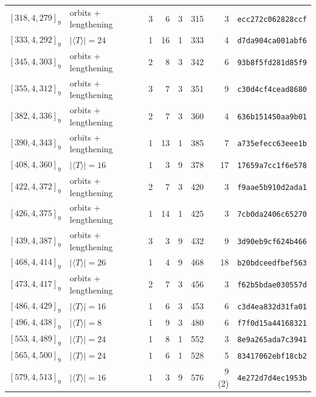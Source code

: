 \begin{longtable}{lllrrrrl}
$[318,4,279]_9$ & orbits + lengthening & 3 & 6 & 3 & 315 & 3 & \texttt{ecc272c062828ccf}\\
$[333,4,292]_9$ & $|\langle T\rangle|=24$ & 1 & 16 & 1 & 333 & 4 & \texttt{d7da904ca001abf6}\\
$[345,4,303]_9$ & orbits + lengthening & 2 & 8 & 3 & 342 & 6 & \texttt{93b8f5fd281d85f9}\\
$[355,4,312]_9$ & orbits + lengthening & 3 & 7 & 3 & 351 & 9 & \texttt{c30d4cf4cead8680}\\
$[382,4,336]_9$ & orbits + lengthening & 2 & 7 & 3 & 360 & 4 & \texttt{636b151450aa9b01}\\
$[390,4,343]_9$ & orbits + lengthening & 1 & 13 & 1 & 385 & 7 & \texttt{a735efecc63eee1b}\\
$[408,4,360]_9$ & $|\langle T\rangle|=16$ & 1 & 3 & 9 & 378 & 17 & \texttt{17659a7cc1f6e578}\\
$[422,4,372]_9$ & orbits + lengthening & 2 & 7 & 3 & 420 & 3 & \texttt{f9aae5b910d2ada1}\\
$[426,4,375]_9$ & orbits + lengthening & 1 & 14 & 1 & 425 & 3 & \texttt{7cb0da2406c65270}\\
$[439,4,387]_9$ & orbits + lengthening & 3 & 3 & 9 & 432 & 9 & \texttt{3d90eb9cf624b466}\\
$[468,4,414]_9$ & $|\langle T\rangle|=26$ & 1 & 4 & 9 & 468 & 18 & \texttt{b20bdceedfbef563}\\
$[473,4,417]_9$ & orbits + lengthening & 2 & 7 & 3 & 456 & 3 & \texttt{f62b5bdae030557d}\\
$[486,4,429]_9$ & $|\langle T\rangle|=16$ & 1 & 6 & 3 & 453 & 6 & \texttt{c3d4ea832d31fa01}\\
$[496,4,438]_9$ & $|\langle T\rangle|=8$ & 1 & 9 & 3 & 480 & 6 & \texttt{f7f0d15a44168321}\\
$[553,4,489]_9$ & $|\langle T\rangle|=24$ & 1 & 8 & 1 & 552 & 3 & \texttt{8e9a265ada7c3941}\\
$[565,4,500]_9$ & $|\langle T\rangle|=24$ & 1 & 6 & 1 & 528 & 5 & \texttt{83417062ebf18cb2}\\
$[579,4,513]_9$ & $|\langle T\rangle|=16$ & 1 & 3 & 9 & 576 & 9 (2) & \texttt{4e272d7d4ec1953b}\\
\bottomrule
\end{longtable}
